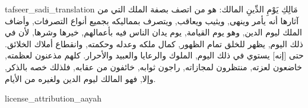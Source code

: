 \begin{taggedblock}{tafseer_sadi_translation}
{ مَالِكِ يَوْمِ الدِّينِ }
المالك: هو من اتصف بصفة الملك التي من آثارها أنه يأمر وينهى, ويثيب ويعاقب, ويتصرف بمماليكه بجميع أنواع التصرفات, وأضاف الملك ليوم الدين, وهو يوم القيامة, يوم يدان الناس فيه بأعمالهم, خيرها وشرها, لأن في ذلك اليوم, يظهر للخلق تمام الظهور, كمال ملكه وعدله وحكمته, وانقطاع أملاك الخلائق. حتى
[إنه]
يستوي في ذلك اليوم, الملوك والرعايا والعبيد والأحرار. كلهم مذعنون لعظمته, خاضعون لعزته, منتظرون لمجازاته, راجون ثوابه, خائفون من عقابه, فلذلك خصه بالذكر, وإلا, فهو المالك ليوم الدين ولغيره من الأيام.
\end{taggedblock}
\begin{taggedblock}{license_attribution_aayah}

\end{taggedblock}
\begin{comment}
Please use the following for footnotes:- Sample\footnoteQ{Text of Qur'an footnote goes here.}.
Sample\footnoteT{Text of Tafseer footnote goes here.}.
\end{comment}